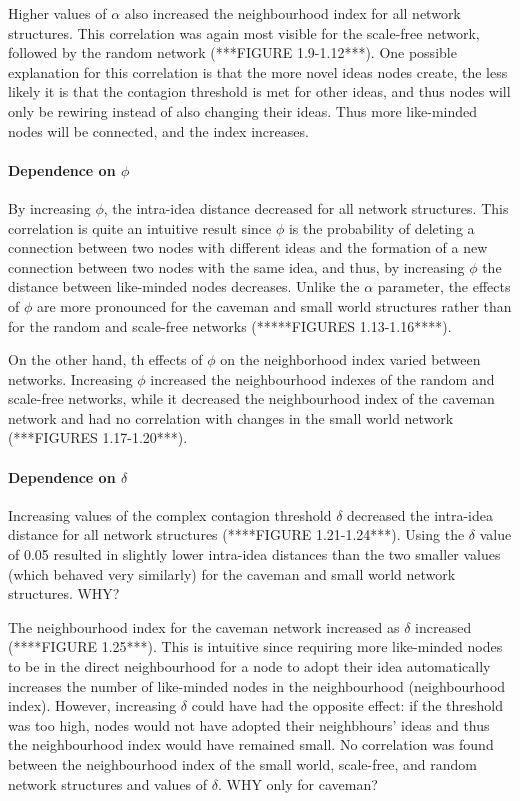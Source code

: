 Higher values of $\alpha$ also increased the neighbourhood index for all network structures. This correlation was again most visible for the scale-free network, followed by the random network (***FIGURE 1.9-1.12***). One possible explanation for this correlation is that the more novel ideas nodes create, the less likely it is that the contagion threshold is met for other ideas, and thus nodes will only be rewiring instead of also changing their ideas. Thus more like-minded nodes will be connected, and the index increases. 


\paragraph{Dependence on $\phi$}
By increasing $\phi$, the intra-idea distance decreased for all network structures. This correlation is quite an intuitive result since $\phi$ is the probability of deleting a connection between two nodes with different ideas and the formation of a new connection between two nodes with the same idea, and thus, by increasing $\phi$ the distance between like-minded nodes decreases. Unlike the $\alpha$ parameter, the effects of $\phi$ are more pronounced for the caveman and small world structures rather than for the random and scale-free networks (*****FIGURES 1.13-1.16****).

On the other hand, th effects of $\phi$ on the neighborhood index varied between networks. Increasing $\phi$ increased the neighbourhood indexes of the random and scale-free networks, while it decreased the neighbourhood index of the caveman network and had no correlation with changes in the small world network (***FIGURES 1.17-1.20***).

\paragraph{Dependence on $\delta$}
Increasing values of the complex contagion threshold $\delta$ decreased the intra-idea distance for all network structures (****FIGURE 1.21-1.24***). Using the $\delta$ value of 0.05 resulted in slightly lower intra-idea distances than the two smaller values (which behaved very similarly) for the caveman and small world network structures. WHY?

The neighbourhood index for the caveman network increased as $\delta$ increased (****FIGURE 1.25***). This is intuitive since requiring more like-minded nodes to be in the direct neighbourhood for a node to adopt their idea automatically increases the number of like-minded nodes in the neighbourhood (neighbourhood index). However, increasing $\delta$ could have had the opposite effect: if the threshold was too high, nodes would not have adopted their neighbhours' ideas and thus the neighbourhood index would have remained small. No correlation was found between the neighbourhood index of the small world, scale-free, and random network structures and values of $\delta$. WHY only for caveman?

